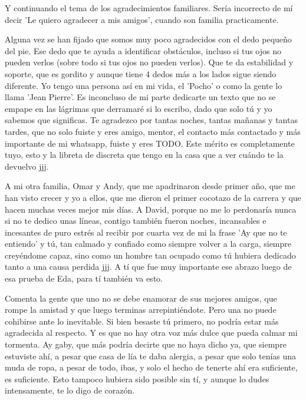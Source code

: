 \begin{acknowledgements}
    Y continuando el tema de los agradecimientos familiares. Sería incorrecto de mí decir 'Le quiero agradecer a mis amigos', cuando son familia practicamente.

    Alguna vez se han fijado que somos muy poco agradecidos con el dedo pequeño del pie. Ese dedo que te ayuda a identificar obstáculos, incluso si tus ojos no pueden verlos (sobre todo si tus ojos no pueden verlos). Que te da estabilidad y soporte, que es gordito y aunque tiene 4 dedos más a los lados sigue siendo diferente. Yo tengo una persona así en mi vida, el 'Pocho' o como la gente lo llama 'Jean Pierre'. Es inconcluso de mi parte dedicarte un texto que no se empape en las lágrimas que derramaré si lo escribo, dado que solo tú y yo sabemos que significas. Te agradezco por tantas noches, tantas mañanas y tantas tardes, que no solo fuiste y eres amigo, mentor, el contacto más contactado y más importante de mi whatsapp, fuiste y eres TODO. Este mérito es completamente tuyo, esto y la libreta de discreta que tengo en la casa que a ver cuándo te la devuelvo jjj.
    
    A mi otra familia, Omar y Andy, que me apadrinaron desde primer año, que me han visto crecer y yo a ellos, que me dieron el primer cocotazo de la carrera y que hacen muchas veces mejor mis días. A David, porque no me lo perdonaría nunca si no te dedico unas líneas, contigo también fueron noches, incansables e incesantes de puro estrés al recibir por cuarta vez de mi la frase 'Ay que no te entiendo' y tú, tan calmado y confiado como siempre volver a la carga, siempre creyéndome capaz, sino como un hombre tan ocupado como tú hubiera dedicado tanto a una causa perdida jjj. A tí que fue muy importante ese abrazo luego de esa prueba de Eda, para tí también va esto.

    Comenta la gente que uno no se debe enamorar de sus mejores amigos, que rompe la amistad y que luego terminas arrepintiéndote. Pero una no puede cohibirse ante lo inevitable. Si bien besaste tú primero, no podría estar más agradecida al respecto. Y es que no hay otra voz más dulce que pueda calmar mi tormenta. Ay gaby, que más podría decirte que no haya dicho ya, que siempre estuviste ahí, a pesar que casa de lía te daba alergia, a pesar que solo tenías una muda de ropa, a pesar de todo, ibas, y solo el hecho de tenerte ahí era suficiente, es suficiente. Esto tampoco hubiera sido posible sin tí, y aunque lo dudes intensamente, te lo digo de corazón.


\end{acknowledgements}
